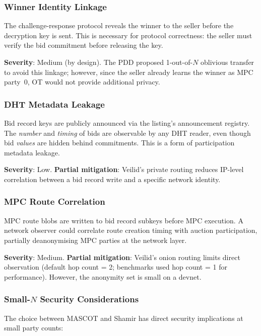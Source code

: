 \subsubsection{Winner Identity Linkage}

The challenge-response protocol reveals the winner to the seller before the
decryption key is sent.  This is necessary for protocol correctness: the
seller must verify the bid commitment before releasing the key.

\textbf{Severity}: Medium (by design).  The PDD proposed 1-out-of-$N$
oblivious transfer to avoid this linkage; however, since the seller already
learns the winner as MPC party~0, OT would not provide additional privacy.

\subsubsection{DHT Metadata Leakage}

Bid record keys are publicly announced via the listing's announcement
registry.  The \emph{number} and \emph{timing} of bids are observable by any
DHT reader, even though bid \emph{values} are hidden behind commitments.
This is a form of participation metadata leakage.

\textbf{Severity}: Low.  \textbf{Partial mitigation}: Veilid's private
routing reduces IP-level correlation between a bid record write and a
specific network identity.

\subsubsection{MPC Route Correlation}

MPC route blobs are written to bid record subkeys before MPC execution.
A network observer could correlate route creation timing with auction
participation, partially deanonymising MPC parties at the network layer.

\textbf{Severity}: Medium.  \textbf{Partial mitigation}: Veilid's onion
routing limits direct observation (default hop count = 2; benchmarks used
hop count = 1 for performance).  However, the anonymity set is small on a
devnet.

\subsubsection{Small-$N$ Security Considerations}

The choice between MASCOT and Shamir has direct security implications at
small party counts:

